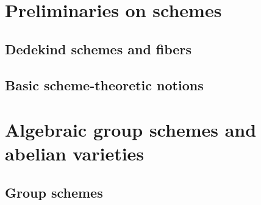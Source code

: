 \nocite{*}

\section{Preliminaries on schemes}

\subsection{Dedekind schemes and fibers}







\subsection{Basic scheme-theoretic notions}












\section{Algebraic group schemes and abelian varieties}

\subsection{Group schemes}










